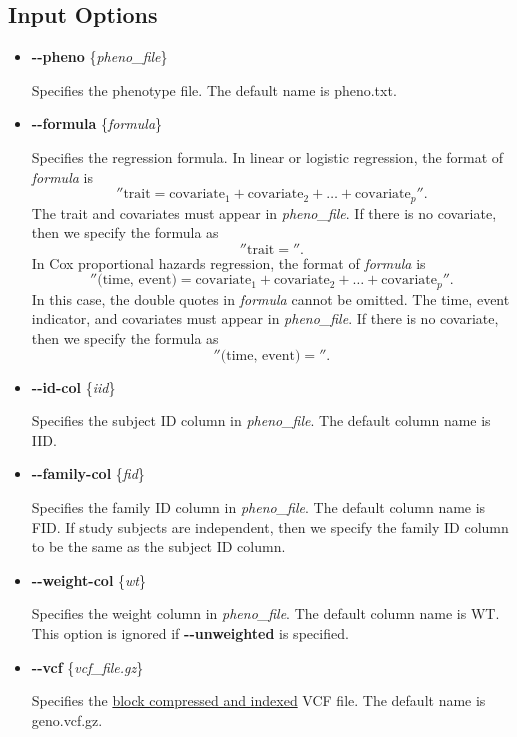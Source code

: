 \documentclass[12pt,letter]{article}
\begin{document}
\subsection{Input Options}
\begin{itemize}
\item {\bf -{}-pheno} \{{\it pheno\_file}\}

Specifies the phenotype file. The default name is {\ttfamily pheno.txt}.

\item {\bf -{}-formula} \{{\it formula}\}

{Specifies the regression formula. In linear or logistic regression, the format of {\it formula} is 
{\ttfamily $$''\text{trait}=\text{covariate}_1+\text{covariate}_2+\dotsc+\text{covariate}_p''.$$}
\flushleft
The trait and covariates must appear in {\it pheno\_file}.
If there is no covariate, then we specify the formula as 
{\ttfamily $$''\text{trait}=''.$$}
\flushleft
In Cox proportional hazards regression, the format of {\it formula} is
{\ttfamily $$''\text{(time, event)}=\text{covariate}_1+\text{covariate}_2
+\dotsc+\text{covariate}_p''.$$}
\flushleft
In this case, the double quotes in {\it formula} cannot be omitted.
The time, event indicator, and covariates must appear in {\it pheno\_file}.
If there is no covariate, then we specify the formula as 
{\ttfamily $$''\text{(time, event)}=''.$$}
}

\item {\bf -{}-id-col} \{{\it iid}\}

Specifies the subject ID column in {\it pheno\_file}. The default column name is {\ttfamily IID}.

\item {\bf -{}-family-col} \{{\it fid}\}

Specifies the family ID column in {\it pheno\_file}. The default column name is {\ttfamily FID}.
If study subjects are independent, then we specify the family ID column to be the same
as the subject ID column.

\item {\bf -{}-weight-col} \{{\it wt}\}

Specifies the weight column in {\it pheno\_file}. The default column name is {\ttfamily WT}.
This option is ignored if {\bf -{}-unweighted}
is specified.

\item {\bf -{}-vcf} \{{\it vcf\_file.gz}\}

Specifies the \href{http://www.htslib.org/doc/tabix.html}{block compressed and indexed} VCF file. The default name 
is {\ttfamily geno.vcf.gz}.


\end{itemize}
\end{document}
